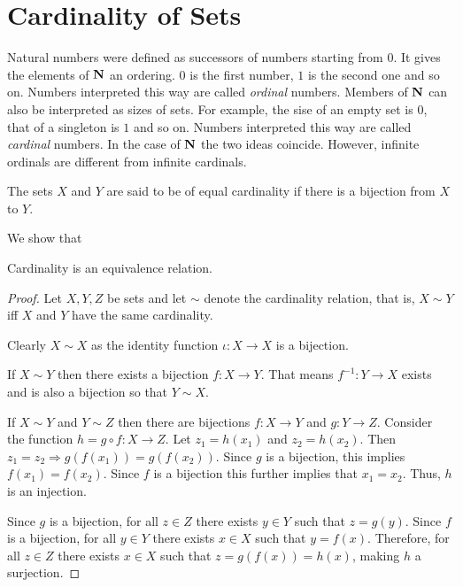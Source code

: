 \section{Cardinality of Sets}\label{c2s6}
Natural numbers were defined as successors of numbers starting from $0$. It
gives the elements of $\mathbf{N}$ an ordering. $0$ is the first number, $1$ is the
second one and so on. Numbers interpreted this way are called \emph{ordinal}
numbers. Members of $\mathbf{N}$ can also be interpreted as sizes of sets. For 
example, the sise of an empty set is $0$, that of a singleton is $1$ and so on.
Numbers interpreted this way are called \emph{cardinal} numbers. In the case of
$\mathbf{N}$ the two ideas coincide. However, infinite ordinals are different from
infinite cardinals.

\begin{defn}\label{c2s6d1}
The sets $X$ and $Y$ are said to be of equal cardinality if there is a bijection
from $X$ to $Y$.
\end{defn}

We show that
\begin{prop}\label{c2s6p1}
Cardinality is an equivalence relation.
\end{prop}
\begin{proof}
Let $X, Y, Z$ be sets and let $\sim$ denote the cardinality relation, that is,
$X \sim Y$ iff $X$ and $Y$ have the same cardinality.

Clearly $X \sim X$ as the identity function $\iota: X \rightarrow X$ is a 
bijection.

If $X \sim Y$ then there exists a bijection $f: X \rightarrow Y$. That means
$f^{-1}: Y \rightarrow X$ exists and is also a bijection so that $Y \sim X$.

If $X \sim Y$ and $Y \sim Z$ then there are bijections $f: X \rightarrow Y$
and $g: Y \rightarrow Z$. Consider the function $h = g \circ f:X \rightarrow Z$.
Let $z_1 = h(x_1)$ and $z_2 = h(x_2)$. Then $z_1 = z_2 \Rightarrow g(f(x_1)) =
g(f(x_2))$. Since $g$ is a bijection, this implies $f(x_1) = f(x_2)$. Since $f$
is a bijection this further implies that $x_1 = x_2$. Thus, $h$ is an injection.

Since $g$ is a bijection, for all $z \in Z$ there exists $y \in Y$ such that $z
= g(y)$. Since $f$ is a bijection, for all $y \in Y$ there exists $x \in X$ such
that $y = f(x)$. Therefore, for all $z \in Z$ there exists $x \in X$ such that
$z = g(f(x)) = h(x)$, making $h$ a surjection.
\end{proof}

